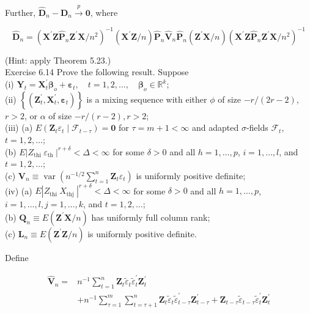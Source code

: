 \documentclass[10pt]{article}
\begin{document}
Further, $\hat{\mathbf{D}}_{n}-\mathbf{D}_{n} \xrightarrow{p} \mathbf{0}$, where

$$
\hat{\mathbf{D}}_{n}=\left(\mathbf{X}^{\prime} \mathbf{Z} \hat{\mathbf{P}}_{n} \mathbf{Z}^{\prime} \mathbf{X} / n^{2}\right)^{-1}\left(\mathbf{X}^{\prime} \mathbf{Z} / n\right) \hat{\mathbf{P}}_{n} \hat{\mathbf{V}}_{n} \hat{\mathbf{P}}_{n}\left(\mathbf{Z}^{\prime} \mathbf{X} / n\right)\left(\mathbf{X}^{\prime} \mathbf{Z} \hat{\mathbf{P}}_{n} \mathbf{Z}^{\prime} \mathbf{X} / n^{2}\right)^{-1}
$$

(Hint: apply Theorem 5.23.)\\
Exercise 6.14 Prove the following result. Suppose\\
(i) $\mathbf{Y}_{t}=\mathbf{X}_{t}^{\prime} \boldsymbol{\beta}_{o}+\boldsymbol{\varepsilon}_{t}, \quad t=1,2, \ldots, \quad \boldsymbol{\beta}_{o} \in \mathbb{R}^{k}$;\\
(ii) $\left\{\left(\mathbf{Z}_{t}^{\prime}, \mathbf{X}_{t}^{\prime}, \boldsymbol{\varepsilon}_{t}\right)\right\}$ is a mixing sequence with either $\phi$ of size $-r /(2 r-2)$, $r>2$, or $\alpha$ of size $-r /(r-2), r>2$;\\
(iii) (a) $E\left(\mathbf{Z}_{t} \varepsilon_{t} \mid \mathcal{F}_{t-\tau}\right)=\mathbf{0}$ for $\tau=m+1<\infty$ and adapted $\sigma$-fields $\mathcal{F}_{t}$, $t=1,2, \ldots$;\\
(b) $E\left|Z_{\text {thi }} \varepsilon_{\text {th }}\right|^{r+\delta}<\Delta<\infty$ for some $\delta>0$ and all $h=1, \ldots, p$, $i=1, \ldots, l$, and $t=1,2, \ldots$;\\
(c) $\mathbf{V}_{n} \equiv \operatorname{var}\left(n^{-1 / 2} \sum_{t=1}^{n} \mathbf{Z}_{t} \varepsilon_{t}\right)$ is uniformly positive definite;\\
(iv) (a) $E\left|Z_{\text {thi }} X_{\text {thj }}\right|^{r+\delta}<\Delta<\infty$ for some $\delta>0$ and all $h=1, \ldots, p$, $i=1, \ldots, l, j=1, \ldots, k$, and $t=1,2, \ldots$;\\
(b) $\mathbf{Q}_{n} \equiv E\left(\mathbf{Z}^{\prime} \mathbf{X} / n\right)$ has uniformly full column rank;\\
(c) $\mathbf{L}_{n} \equiv E\left(\mathbf{Z}^{\prime} \mathbf{Z} / n\right)$ is uniformly positive definite.

Define

$$
\begin{aligned}
\hat{\mathbf{V}}_{n}= & n^{-1} \sum_{t=1}^{n} \mathbf{Z}_{t} \tilde{\varepsilon}_{t} \tilde{\varepsilon}_{t}^{\prime} \mathbf{Z}_{t}^{\prime} \\
& +n^{-1} \sum_{\tau=1}^{m} \sum_{t=\tau+1}^{n} \mathbf{Z}_{t} \tilde{\varepsilon}_{t} \tilde{\varepsilon}_{t-\tau}^{\prime} \mathbf{Z}_{t-\tau}^{\prime}+\mathbf{Z}_{t-\tau} \tilde{\varepsilon}_{t-\tau} \tilde{\varepsilon}_{t}^{\prime} \mathbf{Z}_{t}^{\prime}
\end{aligned}
$$
\end{document}
